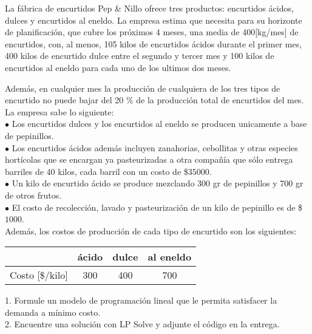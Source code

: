 La fábrica de encurtidos Pep \& Nillo ofrece tres productos: encurtidos ácidos, dulces y encurtidos al eneldo. La empresa estima que necesita para su horizonte de planificación, que cubre los próximos 4 meses, una media de 400[kg/mes] de encurtidos, con, al menos, 105 kilos de encurtidos ácidos durante el primer mes, 400 kilos de encurtido dulce entre el segundo y tercer mes y 100 kilos de encurtidos al eneldo para cada uno de los ultimos dos meses.

Además, en cualquier mes la producción de cualquiera de los tres tipos de encurtido no puede bajar del 20 \% de la producción total de encurtidos del mes. La empresa sabe lo siguiente:\\

$\bullet$ Los encurtidos dulces y los encurtidos al eneldo se producen unicamente a base de pepinillos.\\

$\bullet$ Los encurtidos ácidos además incluyen zanahorias, cebollitas y otras especies hortícolas que se encargan ya pasteurizadas a otra compañía que sólo entrega barriles de 40 kilos, cada barril con un costo de \$$35000$.\\

$\bullet$ Un kilo de encurtido ácido se produce mezclando 300 gr de pepinillos y 700 gr de otros frutos.\\

$\bullet$ El costo de recolección, lavado y pasteurización de un kilo de pepinillo es de \$$1000$.\\

Además, los costos de producción de cada tipo de encurtido son los siguientes:

\begin{center}

\begin{tabular}{ c | c | c | c }
				& \'acido & dulce & al eneldo\\
\hline
Costo [\$/kilo]	& 300	  & 400   & 700\\
\end{tabular}

\end{center}

1. Formule un modelo de programación lineal que le permita satisfacer la demanda a mínimo costo.\\

2. Encuentre una solución con LP Solve y adjunte el código en la entrega.

